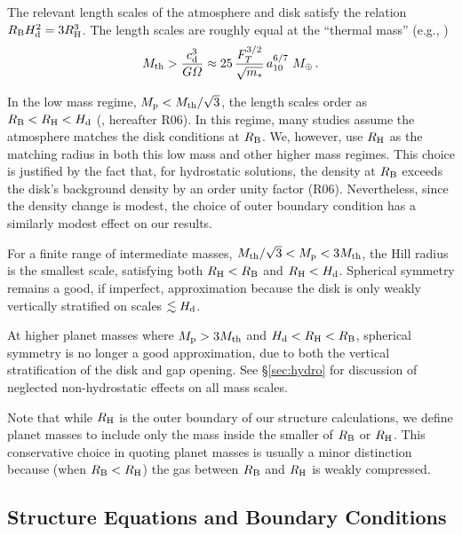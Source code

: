 \documentclass[apj, numberedappendix]{emulateapj}
\newcommand{\RB}{R_{\rm B}}
\newcommand{\RH}{R_{\rm H}}
\newcommand{\pla}{_{\rm p}}
\newcommand{\di}{_{\rm d}}
\newcommand{\aun}[1]{ a_{#1} }
\begin{document}
The relevant length scales of the atmosphere and disk satisfy the relation $\RB H\di^2 = 3 R_{\rm H}^3$.  The length scales are roughly equal at the ``thermal mass'' (e.g., \citealt{menou04})
\begin{equation}
M_{\rm th} > {c\di^{3} \over G \varOmega} \approx 25 \, {F_T^{3/2} \over \sqrt{m_\ast} } \, \aun{10}^{6/7}~ M_\oplus \, .
\end{equation} 

In the low mass regime, $M\pla < M_{\rm th}/\sqrt{3}$, the length scales order as $\RB< \RH<H\di$ (\citealt{rafikov06}, hereafter R06).  In this regime, many studies assume the atmosphere matches the disk conditions at $\RB$.  We, however, use $\RH$ as the matching radius in both this low mass and other higher mass regimes.  This choice is justified by the fact that, for hydrostatic solutions, the  density at $\RB$ exceeds the disk's background density by an order unity factor (R06).  Nevertheless, since the density change is modest, the choice of outer boundary condition has a similarly modest effect on our results. 

For a finite range of intermediate masses, $M_{\rm th}/\sqrt{3} < M\pla < 3 M_{\rm th}$, the Hill radius is the smallest scale, satisfying both $\RH < \RB$ and $\RH < H\di$.  Spherical symmetry remains a good, if imperfect, approximation because the disk is only weakly vertically stratified on  scales $\lesssim H\di$.  

At higher planet masses where $M\pla > 3 M_{\rm th}$ and $H\di < \RH < \RB$, spherical symmetry is no longer a good approximation, due to both the vertical stratification of the disk and gap opening.   See \S\ref{sec:hydro} for discussion of neglected non-hydrostatic effects on all mass scales.

Note that while $\RH$ is the outer boundary of our structure calculations, we define planet masses to include only the mass inside the smaller of $\RB$ or $\RH$.    This conservative choice in quoting planet masses is usually a minor distinction because (when $\RB < \RH$) the gas between $\RB$ and $\RH$ is weakly compressed.


\subsection{Structure Equations and Boundary Conditions}
\label{sec:struct}
\end{document}
